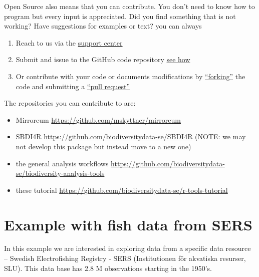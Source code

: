 \documentclass[
  10pt,
]{article}
\providecommand{\tightlist}{%
  \setlength{\itemsep}{0pt}\setlength{\parskip}{0pt}}
\begin{document}
Open Source also means that you can contribute. You don't need to know how to program but every input is appreciated. Did you find something that is not working? Have suggestions for examples or text? you can always

\begin{enumerate}
\def\labelenumi{\arabic{enumi}.}
\tightlist
\item
  Reach to us via the \href{https://docs.biodiversitydata.se/support/}{support center}
\item
  Submit and issue to the GitHub code repository \href{https://docs.github.com/en/github/managing-your-work-on-github/managing-your-work-with-issues-and-pull-requests/creating-an-issue}{see how}
\item
  Or contribute with your code or documents modifications by \href{https://docs.github.com/en/github/getting-started-with-github/quickstart/fork-a-repo}{``forking''} the code and submitting a \href{https://docs.github.com/en/github/collaborating-with-issues-and-pull-requests/proposing-changes-to-your-work-with-pull-requests/creating-a-pull-request-from-a-fork}{``pull request''}
\end{enumerate}

The repositories you can contribute to are:

\begin{itemize}
\tightlist
\item
  Mirroreum \url{https://github.com/mskyttner/mirroreum}\\
\item
  SBDI4R \url{https://github.com/biodiversitydata-se/SBDI4R} (NOTE: we may not develop this package but instead move to a new one)\\
\item
  the general analysis workflows \url{https://github.com/biodiversitydata-se/biodiversity-analysis-tools}\\
\item
  these tutorial \url{https://github.com/biodiversitydata-se/r-tools-tutorial}
\end{itemize}

\hypertarget{example-with-fish-data-from-sers}{%
\section{Example with fish data from SERS}\label{example-with-fish-data-from-sers}}

In this example we are interested in exploring data from a specific data resource -- Swedish Electrofishing Registry - SERS (Institutionen för akvatiska resurser, SLU). This data base has 2.8 M observations starting in the 1950's.
\end{document}
